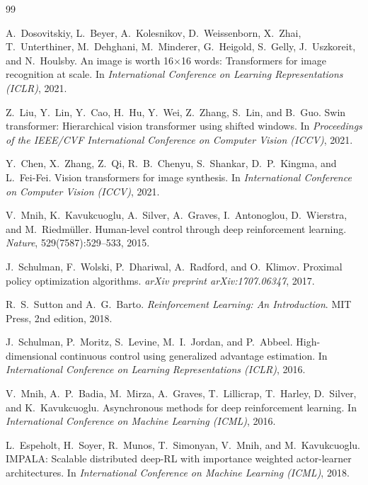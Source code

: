 \documentclass[12pt,a4paper,openany]{report}
\begin{document}
\cleardoublepage
{}
\begin{thebibliography}{99}


 A.~Dosovitskiy, L.~Beyer, A.~Kolesnikov, D.~Weissenborn, X.~Zhai, T.~Unterthiner, M.~Dehghani, M.~Minderer, G.~Heigold, S.~Gelly, J.~Uszkoreit, and N.~Houlsby. An image is worth 16$\times$16 words: Transformers for image recognition at scale. In \textit{International Conference on Learning Representations (ICLR)}, 2021.

 Z.~Liu, Y.~Lin, Y.~Cao, H.~Hu, Y.~Wei, Z.~Zhang, S.~Lin, and B.~Guo. Swin transformer: Hierarchical vision transformer using shifted windows. In \textit{Proceedings of the IEEE/CVF International Conference on Computer Vision (ICCV)}, 2021.

 Y.~Chen, X.~Zhang, Z.~Qi, R.~B.~Chenyu, S.~Shankar, D.~P.~Kingma, and L.~Fei-Fei. Vision transformers for image synthesis. In \textit{International Conference on Computer Vision (ICCV)}, 2021.


 V.~Mnih, K.~Kavukcuoglu, A.~Silver, A.~Graves, I.~Antonoglou, D.~Wierstra, and M.~Riedmüller. Human-level control through deep reinforcement learning. \textit{Nature}, 529(7587):529--533, 2015.

 J.~Schulman, F.~Wolski, P.~Dhariwal, A.~Radford, and O.~Klimov. Proximal policy optimization algorithms. \textit{arXiv preprint arXiv:1707.06347}, 2017.

 R.~S.~Sutton and A.~G.~Barto. \textit{Reinforcement Learning: An Introduction}. MIT Press, 2nd edition, 2018.

 J.~Schulman, P.~Moritz, S.~Levine, M.~I.~Jordan, and P.~Abbeel. High-dimensional continuous control using generalized advantage estimation. In \textit{International Conference on Learning Representations (ICLR)}, 2016.

 V.~Mnih, A.~P.~Badia, M.~Mirza, A.~Graves, T.~Lillicrap, T.~Harley, D.~Silver, and K.~Kavukcuoglu. Asynchronous methods for deep reinforcement learning. In \textit{International Conference on Machine Learning (ICML)}, 2016.


 L.~Espeholt, H.~Soyer, R.~Munos, T.~Simonyan, V.~Mnih, and M.~Kavukcuoglu. IMPALA: Scalable distributed deep-RL with importance weighted actor-learner architectures. In \textit{International Conference on Machine Learning (ICML)}, 2018.


\end{thebibliography}
\end{document}
